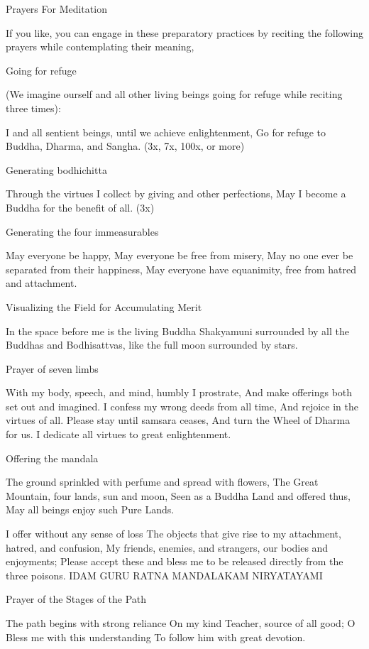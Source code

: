 \documentclass{book}\usepackage[]{graphicx}\usepackage[]{color}
\begin{document}
Prayers For Meditation

If you like, you can engage in these preparatory practices by reciting the following prayers while contemplating their meaning,

Going for refuge

(We imagine ourself and all other living beings going for refuge
while reciting three times):

I and all sentient beings, until we achieve enlightenment,
Go for refuge to Buddha, Dharma, and Sangha. (3x, 7x, 100x, or more)

Generating bodhichitta

Through the virtues I collect by giving and other perfections,
May I become a Buddha for the benefit of all. (3x)

Generating the four immeasurables

May everyone be happy,
May everyone be free from misery,
May no one ever be separated from their happiness,
May everyone have equanimity, free from hatred and attachment.

Visualizing the Field for Accumulating Merit

In the space before me is the living Buddha Shakyamuni surrounded
by all the Buddhas and Bodhisattvas, like the full moon surrounded by stars.

Prayer of seven limbs

With my body, speech, and mind, humbly I prostrate,
And make offerings both set out and imagined.
I confess my wrong deeds from all time,
And rejoice in the virtues of all.
Please stay until samsara ceases,
And turn the Wheel of Dharma for us.
I dedicate all virtues to great enlightenment.

Offering the mandala

The ground sprinkled with perfume and spread with flowers,
The Great Mountain, four lands, sun and moon,
Seen as a Buddha Land and offered thus,
May all beings enjoy such Pure Lands.

I offer without any sense of loss
The objects that give rise to my attachment, hatred, and confusion,
My friends, enemies, and strangers, our bodies and enjoyments;
Please accept these and bless me to be released directly from the three poisons.
IDAM GURU RATNA MANDALAKAM NIRYATAYAMI

Prayer of the Stages of the Path

The path begins with strong reliance
On my kind Teacher, source of all good;
O Bless me with this understanding
To follow him with great devotion.
\end{document}
